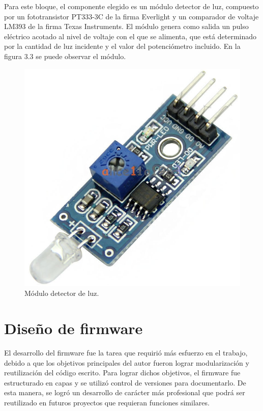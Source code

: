 Para este bloque, el componente elegido es un módulo detector de luz, compuesto por un fototransistor PT333-3C de la firma Everlight y un comparador de voltaje LM393 de la firma Texas Instruments. El módulo genera como salida un pulso eléctrico acotado al nivel de voltaje con el que se alimenta, que está determinado por la cantidad de luz incidente y el valor del potenciómetro incluido. En la figura 3.3 se puede observar el módulo.

\begin{figure}[h]
	\centering
	\includegraphics[scale=0.2]{./Figures/coe.jpg}
	\caption{Módulo detector de luz\protect\footnotemark.}
		\label{fig:cuadradoAzul}
\end{figure}



\section{Diseño de firmware}

El desarrollo del firmware fue la tarea que requirió más esfuerzo en el trabajo, debido a que los objetivos principales del autor fueron lograr modularización y reutilización del código escrito. Para lograr dichos objetivos, el firmware fue estructurado en capas y se utilizó control de versiones para documentarlo. De esta manera, se logró un desarrollo de carácter más profesional que podrá ser reutilizado en futuros proyectos que requieran funciones similares.

